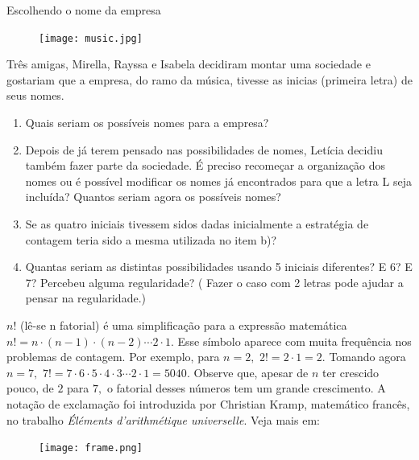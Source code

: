 \begin{task}{Escolhendo o nome da empresa}

\begin{figure}[H]
\centering

\texttt{[image: music.jpg]}
\end{figure}

Três amigas, Mirella, Rayssa  e Isabela decidiram montar uma sociedade e gostariam que a empresa, do ramo da música, tivesse as inicias (primeira letra) de seus nomes.  

\begin{enumerate}

\item Quais seriam os possíveis nomes para a empresa? 

\item Depois de já terem pensado nas possibilidades de nomes, Letícia decidiu também fazer parte da sociedade. É preciso recomeçar a organização dos nomes ou é possível modificar os nomes já encontrados para que a letra L seja incluída? Quantos seriam agora os possíveis nomes?

\item Se as quatro iniciais tivessem sidos dadas inicialmente a estratégia de contagem teria sido a mesma utilizada no item b)?

\item Quantas seriam as distintas possibilidades usando 5 iniciais diferentes? E 6? E 7? Percebeu alguma regularidade? ( Fazer o caso com 2 letras pode ajudar a pensar na regularidade.)

\end{enumerate}

\end{task}

\begin{knowledge}
$n!$ (lê-se n fatorial) é uma simplificação para a expressão matemática $n!=n \cdot (n-1) \cdot (n-2) \cdots 2 \cdot 1.$ Esse símbolo aparece com muita frequência nos problemas de contagem. Por exemplo, para $n=2,$ $2!= 2 \cdot 1 = 2.$ Tomando agora $n=7,$ $7!=7 \cdot 6 \cdot 5 \cdot 4 \cdot 3\cdots 2 \cdot 1 = 5040.$ Observe que, apesar de $n$ ter crescido pouco, de $2$ para $7,$ o fatorial desses números tem um grande crescimento. A notação de exclamação foi introduzida por Christian Kramp, matemático francês, no trabalho \textit{ Éléments d'arithmétique universelle}. Veja mais em:

\begin{figure}[H]
\centering

\texttt{[image: frame.png]}   
\end{figure}
\end{knowledge}



